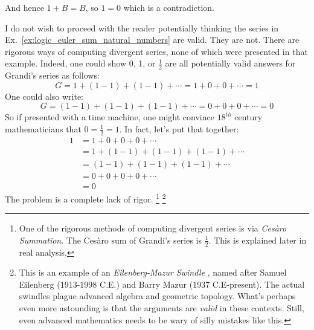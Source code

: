     And hence $1+B=B$, so $1=0$ which is a contradiction.
    \par\hfill\par
    I do not wish to proceed with the reader potentially thinking the series in
    Ex.~\ref{ex:logic_euler_sum_natural_numbers} are valid.
    They are not. There are rigorous
    ways of computing divergent series, none of which were presented in that
    example. Indeed, one could show 0, 1, or $\frac{1}{2}$ are all
    potentially valid answers for Grandi's series as follows:
    \begin{equation}
        G=1+(1-1)+(1-1)+\cdots=1+0+0+\cdots=1
    \end{equation}
    One could also write:
    \begin{equation}
        G=(1-1)+(1-1)+(1-1)+\cdots=0+0+0+\cdots=0
    \end{equation}
    So if presented with a time machine, one might convince $18^{th}$ century
    mathematicians that $0=\frac{1}{2}=1$. In fact, let's put that together:
    \begin{subequations}
        \begin{align}
            1&=1+0+0+0+\cdots\\
            &=1+(1-1)+(1-1)+(1-1)+\cdots\\
            &=(1-1)+(1-1)+(1-1)+\cdots\\
            &=0+0+0+0+\cdots\\
            &=0
        \end{align}
    \end{subequations}
    The problem is a complete lack of rigor.%
    \footnote{%
        One of the rigorous methods of computing divergent series is via
        \textit{Ces\`{a}ro Summation}. The
        Ces\`{a}ro sum of Grandi's series is $\frac{1}{2}$. This is explained
        later in real analysis.
    }
    \footnote{
        This is an example of an \textit{Eilenberg-Mazur Swindle}%
        , named after
        Samuel Eilenberg (1913-1998 C.E.) and Barry Mazur
        (1937 C.E-present). The actual swindles plague advanced algebra
        and geometric topology. What's perhaps even more astounding is that the
        arguments are \textit{valid} in these contexts. Still, even advanced
        mathematics needs to be wary of silly mistakes like this.
    }
